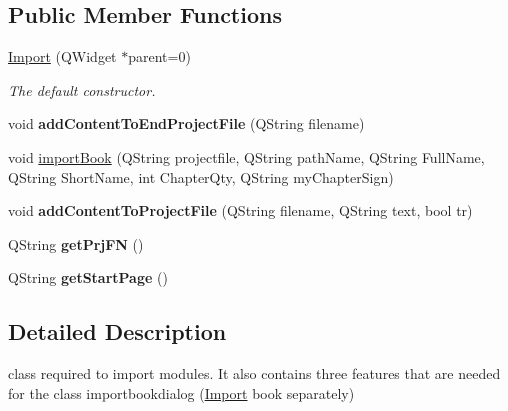 \subsection*{Public Member Functions}
\begin{DoxyCompactItemize}
\item 
\hyperlink{classImport_a6eba0bb8ae41a701f0ea7dfdbd99856c}{Import} (QWidget $\ast$parent=0)
\begin{DoxyCompactList}\small\item\em The default constructor. \item\end{DoxyCompactList}\item 
\hypertarget{classImport_ac00f1a1f7b4784c2efd657cdc8b502c5}{
void {\bfseries addContentToEndProjectFile} (QString filename)}
\label{classImport_ac00f1a1f7b4784c2efd657cdc8b502c5}

\item 
void \hyperlink{classImport_a546cc6c3932b1028aa139376beab85b3}{importBook} (QString projectfile, QString pathName, QString FullName, QString ShortName, int ChapterQty, QString myChapterSign)
\item 
\hypertarget{classImport_a55dc3d2624e169ce1462fab63450e12e}{
void {\bfseries addContentToProjectFile} (QString filename, QString text, bool tr)}
\label{classImport_a55dc3d2624e169ce1462fab63450e12e}

\item 
\hypertarget{classImport_ac04b9632c6b9560cc7704b5ae024e309}{
QString {\bfseries getPrjFN} ()}
\label{classImport_ac04b9632c6b9560cc7704b5ae024e309}

\item 
\hypertarget{classImport_a1329a8a68f94129f5d6b1f20eeabbcd2}{
QString {\bfseries getStartPage} ()}
\label{classImport_a1329a8a68f94129f5d6b1f20eeabbcd2}

\end{DoxyCompactItemize}


\subsection{Detailed Description}
class required to import modules. It also contains three features that are needed for the class importbookdialog (\hyperlink{classImport}{Import} book separately) 

